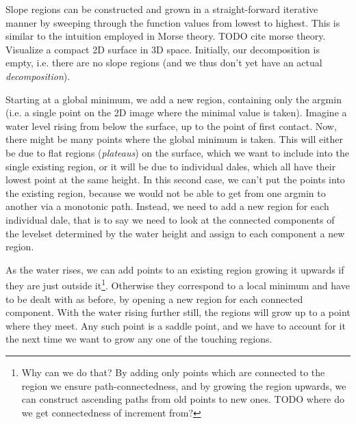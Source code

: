 \documentclass[a4paper,12pt]{paper}
\theoremstyle{plain}
\theoremstyle{definition}
\begin{document}
Slope regions can be constructed and grown in a straight-forward iterative manner by sweeping through the function values from lowest to highest. This is similar to the intuition employed in Morse theory. TODO cite morse theory. Visualize a compact 2D surface in 3D space. Initially, our decomposition is empty, i.e. there are no slope regions (and we thus don't yet have an actual \emph{decomposition}).

Starting at a global minimum, we add a new region, containing only the argmin (i.e. a single point on the 2D image where the minimal value is taken). Imagine a water level rising from below the surface, up to the point of first contact. Now, there might be many points where the global minimum is taken. This will either be due to flat regions (\emph{plateaus}) on the surface, which we want to include into the single existing region, or it will be due to individual dales, which all have their lowest point at the same height. In this second case, we can't put the points into the existing region, because we would not be able to get from one argmin to another via a monotonic path. Instead, we need to add a new region for each individual dale, that is to say we need to look at the connected components of the levelset determined by the water height and assign to each component a new region.

As the water rises, we can add points to an existing region growing it upwards if they are just outside it\footnote{Why can we do that? By adding only points which are connected to the region we ensure path-connectedness, and by growing the region upwards, we can construct ascending paths from old points to new ones. TODO where do we get connectedness of increment from?}. Otherwise they correspond to a local minimum and have to be dealt with as before, by opening a new region for each connected component. With the water rising further still, the regions will grow up to a point where they meet. Any such point is a saddle point, and we have to account for it the next time we want to grow any one of the touching regions.
\end{document}
